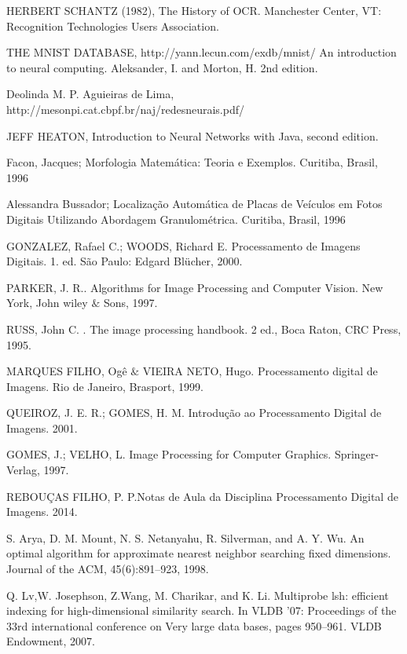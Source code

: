 \documentclass[letterpaper, 10 pt, conference]{ieeeconf}  %
\begin{document}
\begin{thebibliography}{1}

HERBERT SCHANTZ (1982), The History of OCR. Manchester Center, VT: Recognition Technologies Users Association.

THE MNIST DATABASE, http://yann.lecun.com/exdb/mnist/ An introduction to neural computing. Aleksander, I. and Morton, H. 2nd edition.

Deolinda M. P. Aguieiras de Lima, http://mesonpi.cat.cbpf.br/naj/redesneurais.pdf/

JEFF HEATON, Introduction to Neural Networks with Java, second edition.

Facon, Jacques; Morfologia Matemática: Teoria e Exemplos. Curitiba,
 Brasil, 1996

 Alessandra Bussador; Localização Automática de Placas de Veículos em Fotos
Digitais Utilizando Abordagem Granulométrica. Curitiba,
 Brasil, 1996

GONZALEZ, Rafael C.; WOODS, Richard E. Processamento de Imagens Digitais. 1. ed. São Paulo: Edgard Blücher, 2000.

PARKER, J. R.. Algorithms for Image Processing and Computer Vision. New York, John wiley $ \& $ Sons, 1997. 

RUSS, John C. . The image processing handbook. 2 ed., Boca Raton, CRC Press, 1995.

MARQUES FILHO, Ogê $ \& $ VIEIRA NETO, Hugo. Processamento digital de Imagens. Rio de Janeiro, Brasport, 1999.

QUEIROZ, J. E. R.; GOMES, H. M. Introdução ao Processamento Digital de Imagens. 2001. 

GOMES, J.; VELHO, L. Image Processing for Computer Graphics. Springer-Verlag, 1997. 

REBOUÇAS FILHO, P. P.Notas de Aula da Disciplina Processamento Digital de Imagens. 2014. 

S. Arya, D. M. Mount, N. S. Netanyahu, R. Silverman, and A. Y. Wu. An optimal algorithm for approximate nearest neighbor searching fixed dimensions. Journal of the ACM, 45(6):891–923, 1998.

Q. Lv,W. Josephson, Z.Wang, M. Charikar, and K. Li. Multiprobe lsh: efficient indexing for high-dimensional similarity search. In VLDB ’07: Proceedings of the 33rd international conference on Very large data bases, pages 950–961. VLDB Endowment, 2007.

\end{thebibliography}
\end{document}
